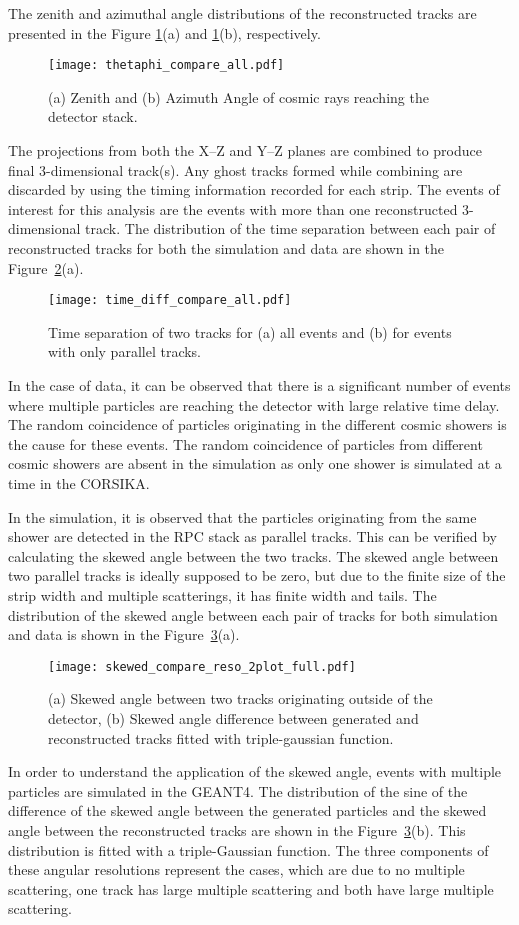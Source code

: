 The zenith and azimuthal angle distributions of the reconstructed
tracks are presented in the Figure \ref{fig:thetaphi}(a) and
\ref{fig:thetaphi}(b), respectively.
\begin{figure}[h]
  \texttt{[image: thetaphi\_compare\_all.pdf]} 
  \caption{(a) Zenith and (b) Azimuth Angle of cosmic rays
    reaching the detector 
stack.}
  \label{fig:thetaphi}
\end{figure}
The projections from both the X--Z and Y--Z planes are combined
to produce final 3-dimensional track(s). Any ghost tracks formed
while combining are discarded by using the timing information recorded
for each strip. The events of interest for this analysis are the
events with more than one reconstructed 3-dimensional track.
The distribution of the time separation between each pair of
reconstructed tracks for both the simulation and data are shown in the
Figure~\ref{fig:time_sep}(a).
\begin{figure}[h]
  \texttt{[image: time\_diff\_compare\_all.pdf]} 
  \caption{Time separation of two tracks for (a) all events and
    (b) for events with only parallel tracks.}
  \label{fig:time_sep}
\end{figure}
In the case of data, it can be observed that there is a significant
number of events where multiple particles are reaching the detector
with large relative time delay. The random coincidence of particles
originating in the different cosmic showers is the cause for these
events. The random coincidence of particles from different cosmic
showers are absent in the simulation as only one shower is simulated
at a time in the CORSIKA.

In the simulation, it is observed that the particles originating
from the same shower are detected in the RPC stack as parallel tracks.
This can be verified by calculating the skewed angle between
the two tracks. The skewed angle between two parallel tracks is
ideally supposed to be zero, but due to the finite size of the strip
width and multiple scatterings, it has finite width and tails.
The distribution of the skewed angle between each pair of tracks
for both simulation and data is shown in the
Figure~\ref{fig:skewed_angle}(a).
\begin{figure}[h]
  \texttt{[image: skewed\_compare\_reso\_2plot\_full.pdf]}
  \caption{(a) Skewed angle between two tracks originating
    outside of the detector, (b) Skewed angle difference
    between generated and reconstructed tracks fitted with
    triple-gaussian function.}
  \label{fig:skewed_angle}
\end{figure}
In order to understand the application of the skewed angle, events
with multiple particles are simulated in the GEANT4. The distribution
of the sine of the difference of the skewed angle between
the generated particles and the skewed angle between
the reconstructed tracks are shown in the
Figure~\ref{fig:skewed_angle}(b). This distribution is fitted with
a triple-Gaussian function. The three components of these angular
resolutions represent the cases, which are due to no multiple
scattering, one track has large multiple scattering and both
have large multiple scattering.

